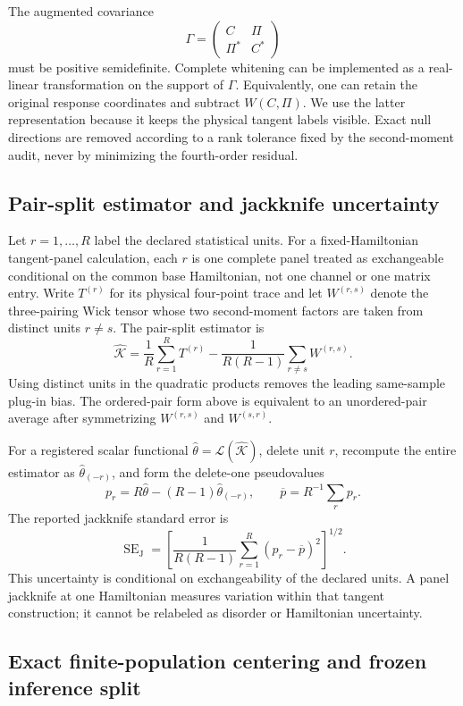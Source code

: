 The augmented covariance
\[
 \Gamma=
 \begin{pmatrix}
 C&\Pi\\
 \Pi^*&C^*
 \end{pmatrix}
\]
must be positive semidefinite.  Complete whitening can be implemented as a
real-linear transformation on the support of $\Gamma$.  Equivalently, one can
retain the original response coordinates and subtract
$W(C,\Pi)$.  We use the latter representation because it keeps the physical
tangent labels visible.  Exact null directions are removed according to a
rank tolerance fixed by the second-moment audit, never by minimizing the
fourth-order residual.

\subsection{Pair-split estimator and jackknife uncertainty}

Let $r=1,\ldots,R$ label the declared statistical units.  For a
fixed-Hamiltonian tangent-panel calculation, each $r$ is one complete panel
treated as exchangeable conditional on the common base Hamiltonian, not one
channel or one matrix entry.  Write $T^{(r)}$ for its physical
four-point trace and let $W^{(r,s)}$ denote the three-pairing Wick tensor whose
two second-moment factors are taken from distinct units $r\ne s$.  The
pair-split estimator is
\[
 \widehat{\mathcal K}
 =\frac{1}{R}\sum_{r=1}^{R}T^{(r)}
 -\frac{1}{R(R-1)}\sum_{r\ne s}W^{(r,s)}.
\]
Using distinct units in the quadratic products removes the leading
same-sample plug-in bias.  The ordered-pair form above is equivalent to an
unordered-pair average after symmetrizing $W^{(r,s)}$ and $W^{(s,r)}$.

For a registered scalar functional
$\widehat\theta=\mathcal L(\widehat{\mathcal K})$, delete unit $r$, recompute
the entire estimator as $\widehat\theta_{(-r)}$, and form the delete-one
pseudovalues
\[
 p_r=R\widehat\theta-(R-1)\widehat\theta_{(-r)},
 \qquad
 \overline p=R^{-1}\sum_r p_r.
\]
The reported jackknife standard error is
\[
 \operatorname{SE}_{\mathrm J}
 =\left[\frac{1}{R(R-1)}
 \sum_{r=1}^{R}(p_r-\overline p)^2\right]^{1/2}.
\]
This uncertainty is conditional on exchangeability of the declared units.  A
panel jackknife at one Hamiltonian measures variation within that tangent
construction; it cannot be relabeled as disorder or Hamiltonian uncertainty.

\subsection{Exact finite-population centering and frozen inference split}

